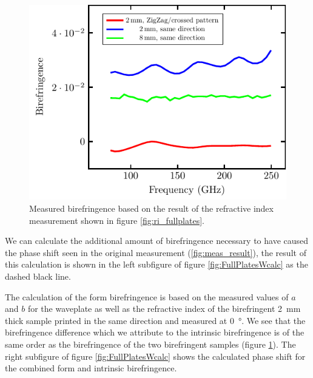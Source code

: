 \begin{figure}[H]
    \centering
    \includegraphics[scale=.7]{images/results/plots/polymer/IntrinsicBF/FullPlates.pdf}
    \caption{Measured birefringence based on the result of the refractive index measurement shown in figure \ref{fig:ri_fullplates}.}
    \label{fig:FullPlates_bf}
\end{figure}

We can calculate the additional amount of birefringence necessary to have caused the phase shift seen in the original measurement (\ref{fig:meas_result}), the result of this calculation is shown in the left subfigure of figure \ref{fig:FullPlatesWcalc} as the dashed black line. 

The calculation of the form birefringence is based on the measured values of $a$ and $b$ for the waveplate as well as the refractive index of the birefringent \SI{2}{\milli \meter} thick sample printed in the same direction and measured at \SI{0}{\degree}. We see that the birefringence difference which we attribute to the intrinsic birefringence is of the same order as the birefringence of the two birefringent samples (figure \ref{fig:FullPlates_bf}). The right subfigure of figure \ref{fig:FullPlatesWcalc} shows the calculated phase shift for the combined form and intrinsic birefringence.

